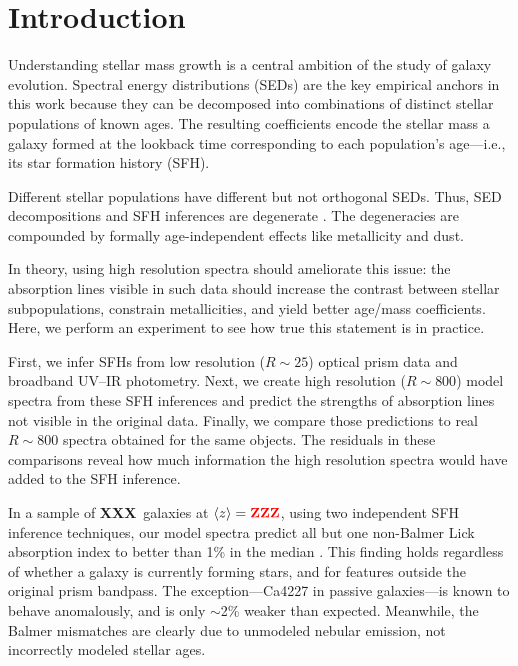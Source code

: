 \documentclass[a4paper,fleqn,usenatbib]{mnras}
\newcommand{\bfr}{\bf\color{red}}
\newcommand{\ntot}{{\bfr XXX}} %
\newcommand{\midz}{{\bfr ZZZ}} %
\begin{document}


\section{Introduction}
\label{sec:intro}

Understanding stellar mass growth is a central ambition of the study of galaxy evolution. 
Spectral energy distributions (SEDs) are the key empirical anchors in this work because they 
can be decomposed into combinations of distinct stellar populations of known ages. The resulting 
coefficients encode the stellar mass a galaxy formed at the lookback time corresponding to each 
population's age---i.e., its star formation history (SFH).
	
Different stellar populations have different but not orthogonal SEDs. Thus, SED decompositions 
and SFH inferences are degenerate \citep{CidFernandes05}. The degeneracies are compounded by 
formally age-independent effects like metallicity and dust.

In theory, using high resolution spectra should ameliorate this issue: the absorption lines visible 
in such data should increase the contrast between stellar subpopulations, constrain metallicities, 
and yield better age/mass coefficients. Here, we perform an experiment to see how true this 
statement is in practice.

First, we infer SFHs from low resolution ($R\sim25$) optical prism 
data and broadband UV--IR photometry. Next, we create high resolution ($R\sim800$) model 
spectra from these SFH inferences and predict the strengths of absorption lines not visible 
in the original data. Finally, we compare those predictions to real $R\sim800$ spectra obtained 
for the same objects. The residuals in these comparisons reveal how much information the high 
resolution spectra would have added to the SFH inference. 

In a sample of \ntot\ galaxies at $\langle z\rangle=\midz$, using two independent SFH inference
techniques, our model spectra predict all but one non-Balmer Lick absorption index 
to better than 1\% in the median \citep{Worthey94}. This finding holds regardless of whether a 
galaxy is currently forming stars, {\color{red} and for features outside the original prism 
bandpass.} The exception---Ca4227 in passive galaxies---is known to behave anomalously, and  
is only $\sim$2\% weaker than expected. Meanwhile, the Balmer mismatches are clearly due to 
unmodeled nebular emission, not incorrectly modeled stellar ages.
\end{document}
